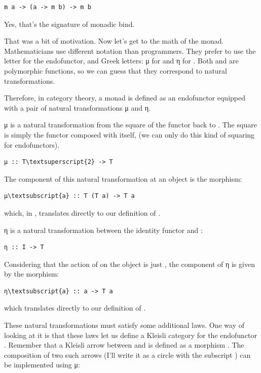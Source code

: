 \begin{verbatim}
m a -> (a -> m b) -> m b
\end{verbatim}
Yes, that's the signature of monadic bind.

That was a bit of motivation. Now let's get to the math of the monad.
Mathematicians use different notation than programmers. They prefer to
use the letter  for the endofunctor, and Greek letters: μ for
 and η for . Both  and
 are polymorphic functions, so we can guess that they
correspond to natural transformations.

Therefore, in category theory, a monad is defined as an endofunctor
 equipped with a pair of natural transformations μ and η.

μ is a natural transformation from the square of the functor 
back to . The square is simply the functor composed with
itself,  (we can only do this kind of squaring for
endofunctors).

\begin{Verbatim}[commandchars=\\\{\}]
μ :: T\textsuperscript{2} -> T
\end{Verbatim}
The component of this natural transformation at an object  is
the morphism:

\begin{Verbatim}[commandchars=\\\{\}]
μ\textsubscript{a} :: T (T a) -> T a
\end{Verbatim}
which, in , translates directly to our definition of
.

η is a natural transformation between the identity functor 
and :

\begin{verbatim}
η :: I -> T
\end{verbatim}
Considering that the action of  on the object  is
just , the component of η is given by the morphism:

\begin{Verbatim}[commandchars=\\\{\}]
η\textsubscript{a} :: a -> T a
\end{Verbatim}
which translates directly to our definition of .

These natural transformations must satisfy some additional laws. One way
of looking at it is that these laws let us define a Kleisli category for
the endofunctor . Remember that a Kleisli arrow between
 and  is defined as a morphism
. The composition of two such arrows
(I'll write it as a circle with the subscript ) can be
implemented using μ:

